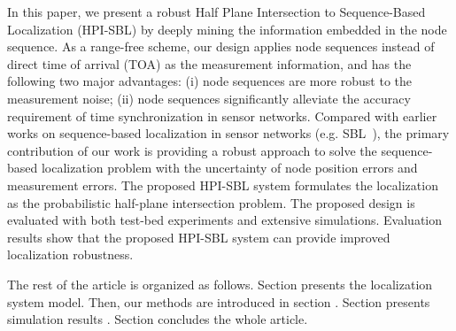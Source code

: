 In this paper, we present a robust Half Plane Intersection to Sequence-Based Localization (HPI-SBL) by deeply mining the information embedded in the node sequence. 
As a range-free scheme, our design applies node sequences instead of direct time of arrival (TOA) as the measurement information, and has the following two major advantages: 
(i) node sequences are more robust to the measurement noise; 
(ii) node sequences significantly alleviate the accuracy requirement of time synchronization in sensor networks. 
Compared with earlier works on sequence-based localization in sensor
networks (e.g. SBL~\cite{yedavalli2008sequence}), the primary contribution
of our work is providing a robust approach to solve the sequence-based localization problem with the uncertainty of node position errors and measurement errors. 
The proposed HPI-SBL system formulates the localization as the probabilistic half-plane intersection problem. 
The proposed design is evaluated with both test-bed experiments and extensive simulations. 
Evaluation results show that the proposed HPI-SBL system can provide improved localization robustness.


The rest of the article is organized as follows. Section \uppercase\expandafter{} presents the localization system model.
Then, our methods are introduced in section \uppercase\expandafter{}.
Section \uppercase\expandafter{} presents simulation results . 
Section \uppercase\expandafter{} concludes the whole article.





